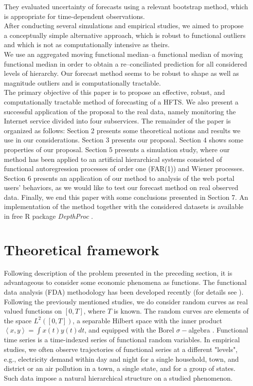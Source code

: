 \documentclass[12pt,a4paper]{article}
\numberwithin{equation}{section}
\begin{document}
They evaluated uncertainty of forecasts using a relevant bootstrap method, which is appropriate for time-dependent observations. \\
After conducting several simulations and empirical studies, we aimed to propose a conceptually simple alternative approach, which is robust to functional outliers and which is not as computationally intensive as theirs.\\
We use an aggregated moving functional median--a functional median of moving functional median in order to obtain a re--conciliated prediction for all considered levels of hierarchy. Our forecast method seems to be robust to shape as well as magnitude outliers and is computationally tractable.
\\ The primary objective of this paper is to propose an effective, robust, and computationally tractable method of forecasting of a HFTS. We also present a successful application of the proposal to the real data, namely monitoring the Internet service divided into four subservices. The remainder of the paper is organized as follows: Section 2 presents some theoretical notions and results we use in our considerations. Section 3 presents our proposal. Section 4 shows some properties of our proposal. Section 5 presents a simulation study, where our method has been applied to an artificial hierarchical systems consisted of functional autoregression processes of order one (FAR(1)) and Wiener processes. Section 6 presents an application of our method to analysis of the web portal users' behaviors, as we would like to test our forecast method on real observed data.
Finally, we end this paper with some conclusions presented in Section 7. An implementation of the method together with the considered datasets is available in free R package \textit{DepthProc} \cite{Kos1}.
\section{Theoretical framework}
\label{sec:2}
Following description of the problem presented in the preceding section, it is advantageous to consider some economic phenomena as functions. The functional data analysis (FDA) methodology has been developed recently (for details see \cite{Bosq,Krzysko,Horvath,Ramsay,Shang}). 
Following the previously mentioned studies, we do consider random curves as real valued functions on $[0, T]$, where $T$ is known. 
The random curves are elements of the space $L^2([0,T])$, a separable Hilbert space with the inner product $\left<x,y\right>=\int x(t)y(t)dt$, and equipped with the Borel $\sigma-$algebra \cite{Bosq}.
Functional time series is a time-indexed series of functional random variables. In empirical studies, we often observe trajectories of functional series at a different "levels", e.g., electricity demand within day and night for a single household, town, and district or an air pollution in a town, a single state, and for a group of states. Such data impose a natural hierarchical structure on a studied phenomenon.
\end{document}
